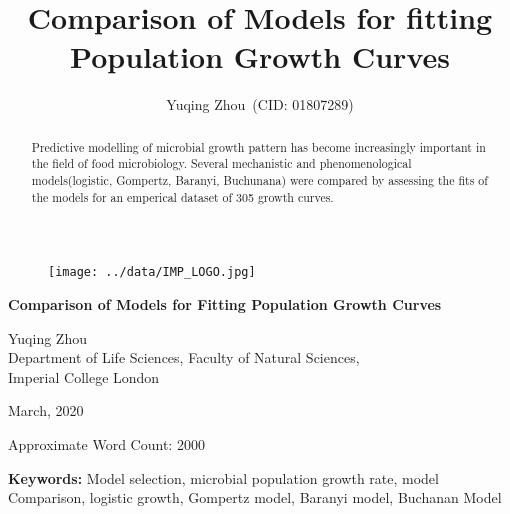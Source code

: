 \documentclass[a4paper,11pt]{article}
\theoremstyle{definition}
\newcommand{\ReportAuthor}{Yuqing Zhou}
\newcommand{\ReportAffil}{Department of Life Sciences, Faculty of Natural Sciences,\\Imperial College London}
\newcommand{\ReportTitle}{Comparison of Models for Fitting Population Growth Curves}
\begin{document}
    \begin{titlepage}
        \vspace{10pt}
        \begin{figure}[!ht]
            \centering
                \begin{center}
                     \texttt{[image: ../data/IMP\_LOGO.jpg]}
                \end{center}
        \end{figure}

        \vspace{5pt}
    	\begin{center}
            \Huge\textbf{\ReportTitle}\\
        \end{center}
        
        \begin{center}
        \vspace{\fill}
            \LARGE\ReportAuthor\\
		    \vspace{6pt}
            \Large\ReportAffil
        \end{center}
        	
        \begin{center}
        \vspace{\fill}
    	    \normalsize{March, 2020}
        \end{center}       
        \begin{flushright}
		    \normalsize Approximate Word Count: 2000%
	    \end{flushright}
    \end{titlepage}
    

\title{Comparison of Models for fitting Population Growth Curves}
\author{Yuqing Zhou\ (CID: 01807289)}

\date{}
\maketitle

\begin{abstract}
Predictive modelling of microbial growth pattern has become increasingly important in the field of food microbiology. Several mechanistic and phenomenological models(logistic, Gompertz, Baranyi, Buchunana) were compared by assessing the fits of the models for an emperical dataset of 305 growth curves.
\end{abstract}
\textbf{Keywords:} Model selection, microbial population growth rate, model Comparison, logistic growth, Gompertz model, Baranyi model, Buchanan Model
\end{document}

